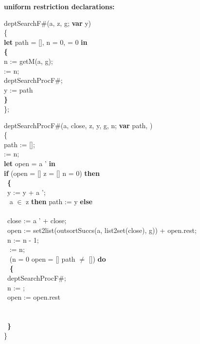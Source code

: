 \bigskip

{\bf uniform restriction declarations:}

deptSearchF\#(a, z, g; {\bf var} y) \\
\{\\
{\bf let} path = [], n = 0,  = 0 {\bf in}\\
{\bf \{}\\
\tabbe n := getM(a, g);\\
\tabbe {} := n;\\
\tabbe deptSearchProcF\#;\\
\tabbe y := path\\
{\bf \}}\\
\};

\bigskip

deptSearchProcF\#(a, close, z, y, g, n; {\bf var} path, ) \\
\{\\
path := [];\\
  := n;\\
 {\bf let} open = a ' {\bf in}\\
 {\bf if} \Not (open = [] \Or z = [] \Or n = 0) {\bf then}\\
 \tabif\  {\bf \{}\\
 \tabif\ \tabbe y := y + a ';\\
 \tabif\  a $\in$ z {\bf then} path := y {\bf else}\\
 \tabif\ \tabbe  {\bf \{}\\
 \tabif\ \tabbe \tabbe close := a ' + close;\\
 \tabif\ \tabbe \tabbe open := set2list(outsortSuccs(a, list2set(close), g)) + open.rest;\\
 \tabif\ \tabbe \tabbe n := n - 1;\\
 \tabif\ \tabbe \tabbe {} := n;\\
 \tabif\ \tabbe {} \Not (n = 0 \Or open = [] \Or path $\neq$ []) {\bf do}\\
 \tabif\ \tabbe \tabbe {} {\bf \{}\\
 \tabif\ \tabbe \tabbe {}\tabbe deptSearchProcF\#;\\
 \tabif\ \tabbe \tabbe {}\tabbe n := ;\\
 \tabif\ \tabbe \tabbe {}\tabbe open := open.rest\\
 \tabif\ \tabbe \tabbe {}\\
 \tabif\ \tabbe {\bf \}}\\
 \tabif\ {\bf \}}\\
\}

\bigskip



\par\mbox{}\hrulefill\mbox{}\par